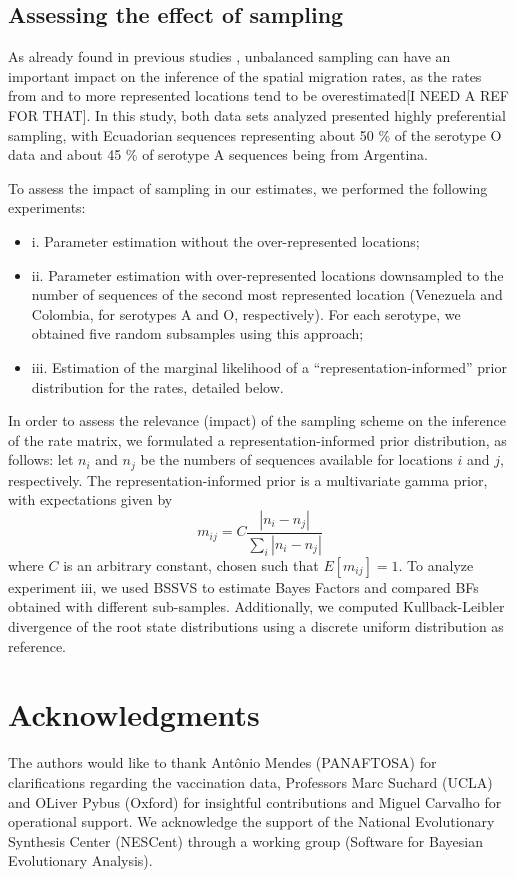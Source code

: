 \documentclass[10pt]{article}
\begin{document}
\subsection*{Assessing the effect of sampling}

As already found in previous studies \cite{Faria2012, Lemey2013}, unbalanced sampling can have an important impact on the inference of the spatial migration rates, as the rates from and to more represented locations tend to be overestimated[I NEED A REF FOR THAT].
In this study, both data sets analyzed presented highly preferential sampling, with Ecuadorian sequences representing about 50 \% of the serotype O data and about 45 \% of serotype A sequences being from Argentina.

To assess the impact of sampling in our estimates, we performed the following experiments:
\begin{itemize}
 \item i. Parameter estimation without the over-represented locations;
 \item ii. Parameter estimation with over-represented locations downsampled to the number of sequences of the second most represented location (Venezuela and Colombia, for serotypes A and O, respectively). For each serotype, we obtained five random subsamples using this approach;
 \item iii. Estimation of the marginal likelihood of a ``representation-informed'' prior distribution for the rates, detailed below.
\end{itemize}

In order to assess the relevance (impact) of the sampling scheme on the inference of the rate matrix, we formulated a representation-informed prior distribution, as follows: let $n_i$ and $n_j$ be the numbers of sequences available for locations $i$ and $j$, respectively.
 The representation-informed prior is a multivariate gamma prior, with expectations given by
\begin{equation}
 m_{ij}=C\frac{|n_i-n_j|}{\sum_i|n_i-n_j|}
\end{equation}
where $C$ is an arbitrary constant, chosen such that $E[m_{ij}]=1$.
To analyze experiment iii, we used BSSVS to estimate Bayes Factors and compared BFs obtained with different sub-samples.
Additionally, we computed Kullback-Leibler divergence \cite{KL,roots} of the root state distributions using a discrete uniform distribution as reference. 

\section*{Acknowledgments}
The authors would like to thank Ant\^onio Mendes (PANAFTOSA) for clarifications regarding the vaccination data, Professors Marc Suchard (UCLA) and OLiver Pybus (Oxford) for insightful contributions and Miguel Carvalho for operational support.
We acknowledge the support of the National Evolutionary Synthesis Center (NESCent) through a working group (Software for Bayesian Evolutionary Analysis).
\end{document}
